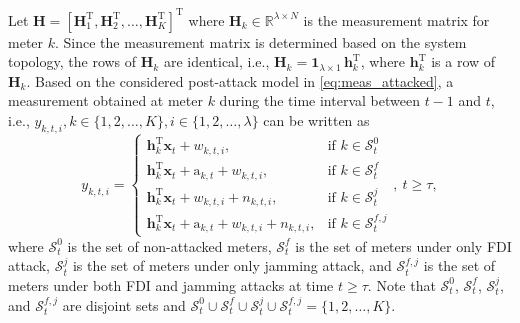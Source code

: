 \documentclass[onecolumn]{IEEEtran}
\begin{document}
Let $\mathbf{H} = [\mathbf{H}_1^\mathrm{T}, \mathbf{H}_2^\mathrm{T}, \dots, \mathbf{H}_K^\mathrm{T}]^\mathrm{T}$ where $\mathbf{H}_k \in \mathbb{R}^{\lambda \times N}$ is the measurement matrix for meter $k$. Since the measurement matrix is determined based on the system topology, the rows of $\mathbf{H}_k$ are identical, i.e., $\mathbf{H}_k = \mathbf{1}_{\lambda \times 1} \, \mathbf{h}_k^\mathrm{T}$, where $\mathbf{h}_k^\mathrm{T}$ is a row of $\mathbf{H}_k$. Based on the considered post-attack model in \eqref{eq:meas_attacked}, a measurement obtained at meter $k$ during the time interval between $t-1$ and $t$, i.e., $y_{k,t,i}, k \in \{1, 2, \dots, K\}, i \in \{1, 2, \dots, \lambda\}$ can be written as
\begin{equation}\label{eq:meas_att_v2}
y_{k,t,i} =
  \begin{cases}
    \mathbf{h}_k^\mathrm{T} \mathbf{x}_t + w_{k,t,i}, & \mbox{if } k \in \mathcal{S}_t^0 \\
    \mathbf{h}_k^\mathrm{T} \mathbf{x}_t + \mathrm{a}_{k,t} + w_{k,t,i}, & \mbox{if } k \in \mathcal{S}_t^f \\
    \mathbf{h}_k^\mathrm{T} \mathbf{x}_t + w_{k,t,i} + n_{k,t,i}, & \mbox{if } k \in \mathcal{S}_t^j \\
    \mathbf{h}_k^\mathrm{T} \mathbf{x}_t + \mathrm{a}_{k,t} + w_{k,t,i} + n_{k,t,i}, & \mbox{if } k \in \mathcal{S}_t^{f,j}
  \end{cases}
  , ~ t \geq \tau,
\end{equation}
where $\mathcal{S}_t^0$ is the set of non-attacked meters, $\mathcal{S}_t^f$ is the set of meters under only FDI attack, $\mathcal{S}_t^j$  is the set of meters under only jamming attack, and $\mathcal{S}_t^{f,j}$ is the set of meters under both FDI and jamming attacks at time $t \geq \tau$. Note that $\mathcal{S}_t^0$, $\mathcal{S}_t^f$, $\mathcal{S}_t^j$, and  $\mathcal{S}_t^{f,j}$ are disjoint sets and $\mathcal{S}_t^0 \cup \mathcal{S}_t^f \cup \mathcal{S}_t^j \cup \mathcal{S}_t^{f,j} = \{1,2,\dots,K\}$.
\end{document}
